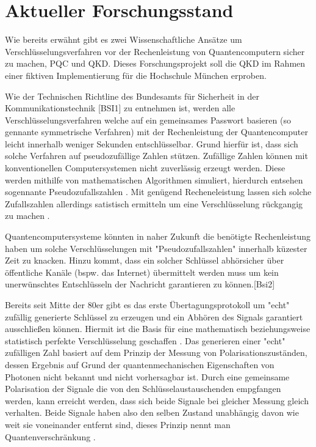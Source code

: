\chapter{Aktueller Forschungsstand}\label{forschungsstand}
Wie bereits erwähnt gibt es zwei Wissenschaftliche Ansätze um Verschlüsselungsverfahren vor der Rechenleistung von Quantencomputern sicher zu machen, \ac{PQC} und \ac{QKD}. Dieses Forschungsprojekt soll die \ac{QKD} im Rahmen einer fiktiven Implementierung für die Hochschule München erproben.

Wie der Technischen Richtline des Bundesamts für Sicherheit in der Kommunikationstechnik [BSI1] zu entnehmen ist, werden alle Verschlüsselungsverfahren welche auf ein gemeinsames Passwort basieren (so gennante symmetrische Verfahren) mit der Rechenleistung der Quantencomputer leicht innerhalb weniger Sekunden entschlüsselbar.
Grund hierfür ist, dass sich solche Verfahren auf pseudozufällige Zahlen stützen. Zufällige Zahlen können mit konventionellen Computersystemen nicht zuverlässig erzeugt werden. Diese werden mithilfe von mathematischen Algorithmen simuliert, hierdurch entsehen sogennante Pseudozufallszahlen \cite{Hinze}.
Mit genügend Recheneleistung lassen sich solche Zufallszahlen allerdings satistisch ermitteln um eine Verschlüsselung rückgangig zu machen \cite{Kreitz}.

Quantencomputersysteme könnten in naher Zukunft die benötigte Rechenleistung haben um solche Verschlüsselungen mit "Pseudozufallszahlen" innerhalb küzester Zeit zu knacken. Hinzu kommt, dass ein solcher Schlüssel abhörsicher über öffentliche Kanäle (bspw. das Internet) übermittelt werden muss um kein unerwünschtes Entschlüsseln der Nachricht garantieren zu können.[Bsi2]

Bereits seit Mitte der 80er gibt es das erste Übertagungsprotokoll um "echt" zufällig generierte Schlüssel zu erzeugen und ein Abhören des Signals garantiert ausschließen können.
Hiermit ist die Basis für eine mathematisch beziehungsweise statistisch perfekte Verschlüsselung geschaffen \cite{Chekhova}. Das generieren einer "echt" zufälligen Zahl basiert auf dem Prinzip der Messung von Polarisationszuständen, dessen Ergebnis auf Grund der quantenmechanischen Eigenschaften von Photonen nicht bekannt und nicht vorhersagbar ist. Durch eine gemeinsame Polarisation der Signale die von den Schlüsselaustauschenden empgfangen werden, kann erreicht werden, dass sich beide Signale bei gleicher Messung gleich verhalten. Beide Signale haben also den selben Zustand unabhängig davon wie weit sie voneinander entfernt sind, dieses Prinzip nennt man Quantenverschränkung \cite{Spektrum}.

